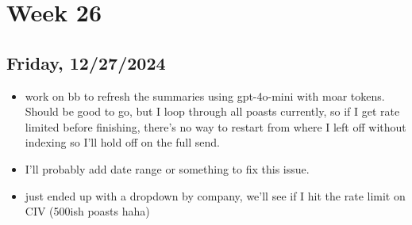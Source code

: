 \newpage
\section{Week 26}

\subsection{Friday, 12/27/2024}
\begin{itemize}
    \item work on bb to refresh the summaries using gpt-4o-mini with moar
        tokens. Should be good to go, but I loop through all poasts currently,
        so if I get rate limited before finishing, there's no way to restart
        from where I left off without indexing so I'll hold off on the full
        send.
    \item I'll probably add date range or something to fix this issue.
    \item just ended up with a dropdown by company, we'll see if I hit the rate
        limit on CIV (500ish poasts haha)
\end{itemize}
